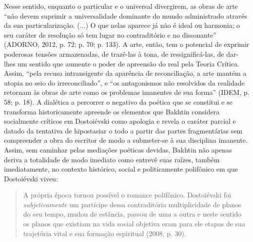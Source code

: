Nesse sentido, enquanto o particular e o universal divergirem, as obras
de arte ``não devem suprimir a universalidade dominante do mundo
administrado através da sua particularização. (...) O que nelas aparece
já não é ideal ou harmonia; o seu caráter de resolução só tem lugar no
contraditório e no dissonante'' (ADORNO, 2012, p. 72; p. 70; p. 133). A
arte, então, tem o potencial de exprimir poderosas tensões armazenadas,
de trazê-las à tona, de ressignificá-las, de dar-lhes um sentido que
aumente o poder de apreensão do real pela Teoria Crítica. Assim, ``pela
recusa intransigente da aparência de reconciliação, a arte mantém a
utopia no seio do irreconciliado'', e ``os antagonismos não resolvidos
da realidade retornam às obras de arte como os problemas imanentes de
sua forma'' (IDEM, p. 58; p. 18). A dialética a percorrer o negativo da
poética que se constitui e se transforma historicamente apreende os
elementos que Bakhtin considera socialmente críticos em Dostoiévski como
apologia e revela o caráter parcial e datado da tentativa de hipostasiar
o todo a partir das partes fragmentárias sem compreender a obra do
escritor de modo a submeter-se à sua disciplina imanente. Assim, sem
caminhar pelas mediações poéticas devidas, Bakhtin não apenas deriva a
totalidade de modo imediato como entrevê suas raízes, também
imediatamente, no contexto histórico, social e politicamente polifônico
em que Dostoiévski viveu:

\begin{quote}
A própria época tornou possível o romance polifônico. Dostoiévski foi
\emph{subjetivamente} um partícipe dessa contraditória multiplicidade de
planos do seu tempo, mudou de estância, passou de uma a outra e neste
sentido os planos que existiam na vida social objetiva eram para ele
etapas de sua trajetória vital e sua formação espiritual (2008, p. 30).
\end{quote}

